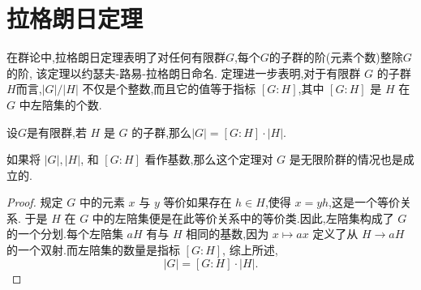 \documentclass[main]{subfiles}
\begin{document}
\renewcommand{\filename}{subfile20}%

\section{拉格朗日定理}
在群论中,拉格朗日定理表明了对任何有限群$G$,每个$G$的子群的阶(元素个数)整除$G$的阶,
该定理以约瑟夫-路易-拉格朗日命名.
定理进一步表明,对于有限群 $G$ 的子群 $H$而言,$|G| /|H|$ 不仅是个整数,而且它的值等于指标 $[G: H]$,其中 $[G: H]$ 是 $H$ 在 $G$ 中左陪集的个数.
\begin{theorem}[拉格朗日定理]
    设$G$是有限群,若 $H$ 是 $G$ 的子群,那么$|G|=[G: H] \cdot|H|$.
\end{theorem}

如果将 $|G|,|H|$, 和 $[G: H]$ 看作基数,那么这个定理对 $G$ 是无限阶群的情况也是成立的.
\begin{proof}
    规定 $G$ 中的元素 $x$ 与 $y$ 等价如果存在 $h\in H$,使得 $x=yh$,这是一个等价关系.
    于是 $H$ 在 $G$ 中的左陪集便是在此等价关系中的等价类.因此,左陪集构成了 $G$ 的一个分划.每个左陪集 $aH$ 有与
     $H$ 相同的基数,因为 $x \mapsto a x$ 定义了从 $H \rightarrow a H$ 的一个双射.而左陪集的数量是指标 $[G: H]$,
     综上所述,
     $$
     |G|=[G: H] \cdot|H| .
     $$
\end{proof}
\end{document}
